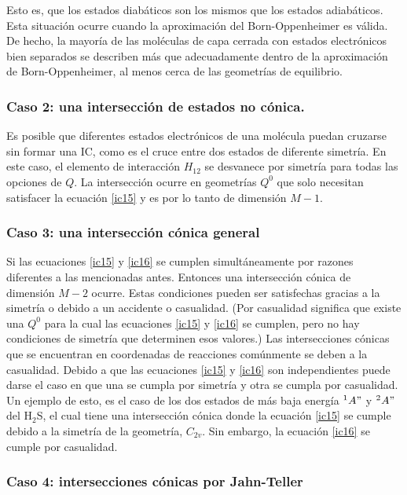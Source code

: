 \documentclass[12pt]{report}
\begin{document}
Esto es, que los estados diabáticos son los mismos que los estados adiabáticos.  Esta situación ocurre cuando la aproximación del Born-Oppenheimer es válida. De hecho, la mayoría de las moléculas de capa cerrada con estados electrónicos bien separados se describen más que adecuadamente dentro de la aproximación de Born-Oppenheimer, al menos cerca de las geometrías de equilibrio.

\subsubsection{Caso 2: una intersección de estados no cónica.}

Es posible que diferentes estados electrónicos de una molécula puedan cruzarse sin formar una IC, como es el cruce entre dos estados de diferente simetría. En este caso, el elemento de interacción $H_{12}$ se desvanece por simetría para todas las opciones de $Q$.  La intersección ocurre en geometrías  $Q^0$ que solo necesitan satisfacer la ecuación \ref{ic15} y es por lo tanto de dimensión $M-1$.

\subsubsection{Caso 3: una intersección cónica general}
Si las ecuaciones \ref{ic15} y \ref{ic16} se cumplen simultáneamente por razones diferentes a las mencionadas antes. Entonces una intersección cónica de dimensión $M-2$ ocurre. Estas condiciones pueden ser satisfechas gracias a la simetría o debido a un accidente o casualidad. (Por casualidad significa que existe una $Q^0$ para la cual las ecuaciones \ref{ic15} y \ref{ic16} se cumplen, pero no hay condiciones de simetría que determinen esos valores.) Las intersecciones cónicas que se encuentran en coordenadas de reacciones comúnmente se deben a la casualidad. Debido a que las ecuaciones \ref{ic15} y \ref{ic16} son independientes puede darse el caso en que una se cumpla por simetría y otra se cumpla por casualidad. Un ejemplo de esto\cite{Applegate2003}, es el caso de los dos estados de más baja energía $^1A"$ y $^2A"$ del H$_2$S, el cual tiene una intersección cónica donde la ecuación \ref{ic15} se cumple debido a la simetría de la geometría, $C_{2v}$. Sin embargo, la ecuación \ref{ic16} se cumple por casualidad.


\subsubsection{Caso 4: intersecciones cónicas por Jahn-Teller
} 
\end{document}
